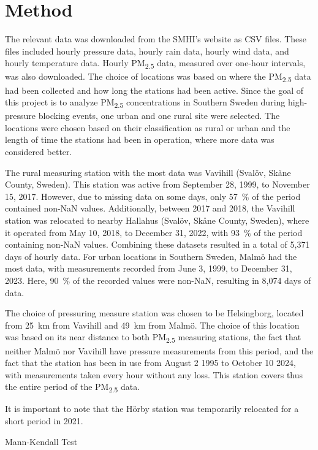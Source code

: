 \newpage
\section{Method}
The relevant data was downloaded from the SMHI’s website as CSV files. These files included hourly pressure data, hourly rain data, hourly wind data, and hourly temperature data. Hourly PM\textsubscript{2.5} data, measured over one-hour intervals, was also downloaded. The choice of locations was based on where the PM\textsubscript{2.5} data had been collected and how long the stations had been active. Since the goal of this project is to analyze PM\textsubscript{2.5} concentrations in Southern Sweden during high-pressure blocking events, one urban and one rural site were selected. The locations were chosen based on their classification as rural or urban and the length of time the stations had been in operation, where more data was considered better. 

The rural measuring station with the most data was Vavihill (Svalöv, Skåne County, Sweden). This station was active from September 28, 1999, to November 15, 2017. However, due to missing data on some days, only \SI{57}{\%} of the period contained non-NaN values. Additionally, between 2017 and 2018, the Vavihill station was relocated to nearby Hallahus (Svalöv, Skåne County, Sweden), where it operated from May 10, 2018, to December 31, 2022, with \SI{93}{\%} of the period containing non-NaN values. Combining these datasets resulted in a total of 5,371 days of hourly data. For urban locations in Southern Sweden, Malmö had the most data, with measurements recorded from June 3, 1999, to December 31, 2023. Here, \SI{90}{\%} of the recorded values were non-NaN, resulting in 8,074 days of data.

The choice of pressuring measure station was chosen to be Helsingborg, located from \SI{25}{\km} from Vavihill and \SI{49}{\km} from Malmö. The choice of this location was based on its near distance to both PM\textsubscript{2.5} measuring stations, the fact that neither Malmö nor Vavihill have pressure measurements from this period, and the fact that the station has been in use from August 2 1995 to October 10 2024, with measurements taken every hour without any loss. This station covers thus the entire period of the PM\textsubscript{2.5} data. 

It is important to note that the Hörby station was temporarily relocated for a short period in 2021.

Mann-Kendall Test

